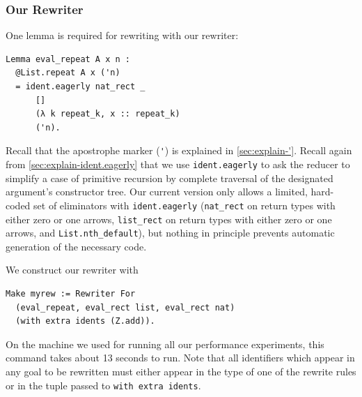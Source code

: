 \begin{subappendices}
\subsubsection{Our Rewriter}
One lemma is required for rewriting with our rewriter:
\begin{verbatim}
Lemma eval_repeat A x n :
  @List.repeat A x ('n)
  = ident.eagerly nat_rect _
      []
      (λ k repeat_k, x :: repeat_k)
      ('n).
\end{verbatim}
Recall that the apostrophe marker (\verb|'|) is explained in \autoref{sec:explain-'}.
Recall again from \autoref{sec:explain-ident.eagerly} that we use \texttt{ident.eagerly} to ask the reducer to simplify a case of primitive recursion by complete traversal of the designated argument's constructor tree.
Our current version only allows a limited, hard-coded set of eliminators with \texttt{ident.eagerly} (\texttt{nat\_rect} on return types with either zero or one arrows, \texttt{list\_rect} on return types with either zero or one arrows, and \texttt{List.nth\_default}), but nothing in principle prevents automatic generation of the necessary code.

We construct our rewriter with
\begin{verbatim}
Make myrew := Rewriter For
  (eval_repeat, eval_rect list, eval_rect nat)
  (with extra idents (Z.add)).
\end{verbatim}
On the machine we used for running all our performance experiments, this command takes about 13 seconds to run.
Note that all identifiers which appear in any goal to be rewritten must either appear in the type of one of the rewrite rules or in the tuple passed to \texttt{with extra idents}.


\end{subappendices}
